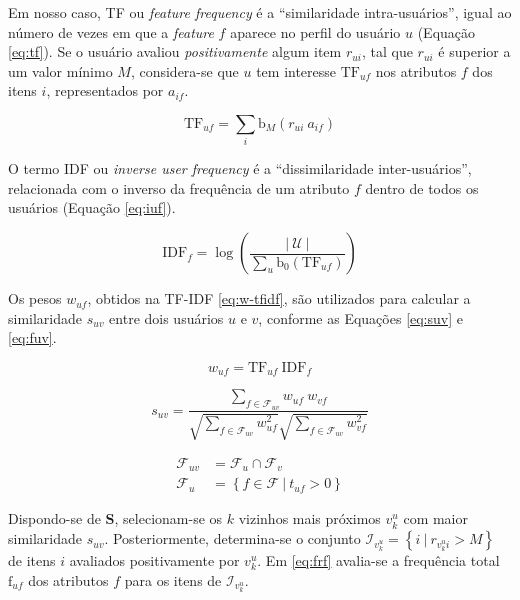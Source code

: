 Em nosso caso, TF ou \textit{feature frequency} é a ``similaridade intra-usuários'', igual ao número de vezes em que a \textit{feature} $f$ aparece no perfil do usuário $u$ (Equação \ref{eq:tf}). Se o usuário avaliou \textit{positivamente} algum item $r_{ui}$, tal que $r_{ui}$ é superior a um valor mínimo $M$, considera-se que $u$ tem interesse $\mathrm{TF}_{uf}$ nos atributos $f$ dos itens $i$, representados por $a_{if}$. 

\begin{equation}
\label{eq:tf} 
    \mathrm{TF}_{uf}  = \sum_{i}{\mathrm{b}_M\left(r_{ui}~a_{if}\right)} 
\end{equation} 

O termo IDF ou \textit{inverse user frequency} é a ``dissimilaridade inter-usuários'', relacionada com o inverso da frequência de um atributo $f$ dentro de todos os usuários (Equação \ref{eq:iuf}).

\begin{equation}
\label{eq:iuf} 
    \mathrm{IDF}_{f} = \log \left( \frac{\left|~\mathcal{U}~\right|}{\sum_{u}{\mathrm{b}_0\left(\mathrm{TF}_{uf}\right)}} \right)
\end{equation} 

Os pesos $w_{uf}$, obtidos na TF-IDF \ref{eq:w-tfidf}, são utilizados para calcular a similaridade $s_{uv}$ entre dois usuários $u$ e $v$, conforme as Equações \ref{eq:suv} e \ref{eq:fuv}.

\begin{equation}
\label{eq:w-tfidf} 
    w_{uf} = \mathrm{TF}_{uf}~\mathrm{IDF}_{f}
\end{equation} 


\begin{equation}
\label{eq:suv}
    s_{uv} = \frac{\sum\limits_{f \in \mathcal{F}_{uv}}{w_{uf}~w_{vf}}}{\sqrt{\sum\limits_{f \in \mathcal{F}_{uv}
    }w_{uf}^2} \sqrt{\sum\limits_{f \in \mathcal{F}_{uv}}w_{vf}^2}} 
\end{equation} 

\begin{equation}
\label{eq:fuv}
\begin{split}
    \mathcal{F}_{uv} &= \mathcal{F}_u \cap \mathcal{F}_v \\
    \mathcal{F}_u &= \left\{ f \in \mathcal{F}~|~t_{uf} > 0 \right\}
\end{split}    
\end{equation} 

Dispondo-se de $\mathbf{S}$, selecionam-se os $k$ vizinhos mais próximos $v_k^u$ com maior similaridade $s_{uv}$.  Posteriormente, determina-se o conjunto $\mathcal{I}_{v_k^u} = \left\{ i ~|~ r_{v_k^u i} > M\right\}$ de itens $i$ avaliados positivamente por $v_k^u$. Em \ref{eq:frf} avalia-se a frequência total $\mathrm{f}_{uf}$ dos atributos $f$ para os itens de $\mathcal{I}_{v_k^u}$. 

